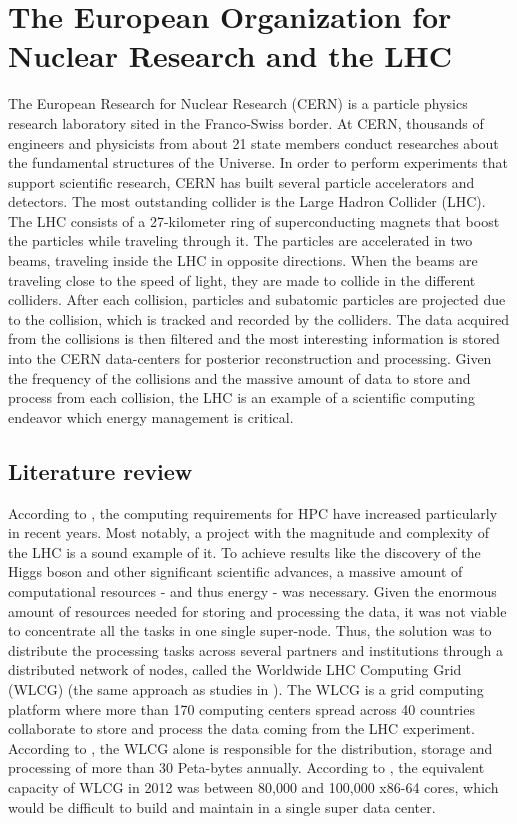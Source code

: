 \section{The European Organization for Nuclear Research and the LHC}

The European Research for Nuclear Research (CERN) \cite{CERN} is a particle physics
research laboratory sited in the Franco-Swiss border. At CERN, thousands of
engineers and physicists from about 21 state members conduct researches about the
fundamental structures of the Universe. In order to perform experiments that
support scientific research, CERN has built several particle accelerators and detectors.
The most outstanding collider is the Large Hadron Collider (LHC). The LHC
consists of a 27-kilometer ring of superconducting magnets that boost the
particles while traveling through it. The particles are accelerated in two
beams, traveling inside the LHC in opposite directions. When the beams are
traveling close to the speed of light, they are made to collide in the different
colliders. After each collision, particles and subatomic particles are projected
due to the collision, which is tracked and recorded by the colliders. The data
acquired from the collisions is then filtered and the most interesting
information is stored into the CERN data-centers for posterior reconstruction
and processing. Given the frequency of the collisions and the massive amount of
data to store and process from each collision, the LHC is an example of a scientific
computing endeavor which energy management is critical.  


\subsection*{Literature review}

According to \cite{ACAT13ARM}, the computing requirements for HPC have increased 
particularly in recent years. Most notably, a project with the magnitude and complexity of the 
LHC is a sound example of it. To achieve results like the discovery of
the Higgs boson \cite{HIGGS1} \cite{HIGGS2} and other significant scientific
advances, a massive amount of computational resources - and thus energy - was
necessary. Given the enormous amount of resources needed for storing and
processing the data, it was not viable to concentrate all the tasks in one
single super-node. Thus, the solution was to distribute the processing tasks across 
several partners and institutions through a distributed network of nodes, called
the Worldwide LHC Computing Grid (WLCG) (the same approach as studies in \cite{ENERGY_DILEMMA}). The WLCG \cite{WLCG} is a grid
computing platform where more than 170 computing centers spread across 40
countries \cite{WLCG} collaborate to store and process the data coming from the
LHC experiment. According to \cite{WLCG}, the WLCG alone is responsible for the distribution, 
storage and processing of more than 30 Peta-bytes annually. According to
\cite{ACAT13ARM}, the equivalent capacity of WLCG in 2012 was between 80,000 and 100,000 x86-64 cores, which would be difficult to build and maintain in a single super data center.

